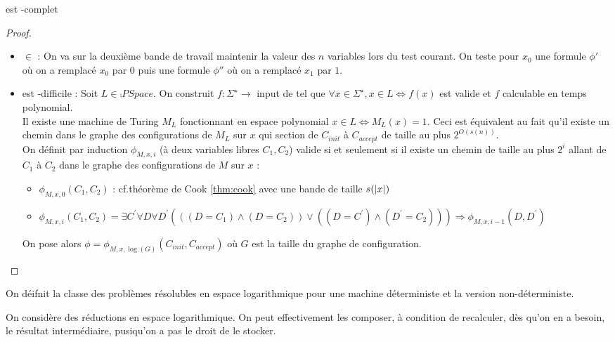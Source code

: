 \documentclass{cours}
\begin{document}
\begin{proposition}
     est -complet
\end{proposition}
\begin{proof}
    \begin{itemize}
        \item {} $\in$  : On va sur la deuxième bande de travail maintenir la valeur des $n$ variables lors du test courant. On teste pour $x_{0}$ une formule $\phi'$ où on a remplacé $x_{0}$ par $0$ puis une formule $\phi''$ où on a remplacé $x_{1}$ par $1$. 
        \item {} est -difficile : Soit $L \in \comp{PSpace}$. On construit $f : \Sigma^{\star} \rightarrow$ input de  tel que $\forall x \in \Sigma^{\star}, x \in L \Leftrightarrow f(x)$ est valide et $f$ calculable en temps polynomial. \\
        Il existe une machine de Turing $M_{L}$ fonctionnant en espace polynomial $x\in L \Leftrightarrow M_{L}(x) = 1$. Ceci est équivalent au fait qu'il existe un chemin dans le graphe des configurations de $M_{L}$ sur $x$ qui section de $C_{init}$ à $C_{accept}$ de taille au plus $2^{O(s(n))}$.\\
        On définit par induction $\phi_{M, x, i}$ (à deux variables libres $C_{1}, C_{2}$) valide si et seulement si il existe un chemin de taille au plus $2^{i}$ allant de $C_{1}$ à $C_{2}$ dans le graphe des configurations de $M$ sur $x$ : 
        \begin{itemize}
            \item $\phi_{M, x, 0}(C_{1}, C_{2})$ : cf.théorème de Cook \ref{thm:cook} avec une bande de taille $s(\left|x\right|)$
            \item $\phi_{M, x, i}(C_{1}, C_{2}) = \exists C^{'}\forall D \forall D^{'}\left(\left((D = C_{1})\land (D = C_{2})\right)\lor \left((D = C^{'}) \land (D^{'} = C_{2})\right)\right) \Rightarrow \phi_{M, x, i - 1}(D, D^{'})$
        \end{itemize}
        On pose alors $\phi = \phi_{M, x, \log(G)}(C_{init}, C_{accept})$ où $G$ est la taille du graphe de configuration. 
    \end{itemize}
\end{proof}

\begin{definition}
    On déifnit  la classe des problèmes résolubles en espace logarithmique pour une machine déterministe et  la version non-déterministe. 
\end{definition}
On considère des réductions en espace logarithmique. On peut effectivement les composer, à condition de recalculer, dès qu'on en a besoin, le résultat intermédiaire, pusiqu'on a pas le droit de le stocker. 
\end{document}

